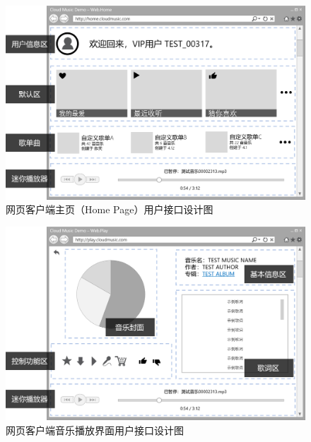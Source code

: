 \begin{figure}[h!]
  \centering

  \includegraphics[width=.95\linewidth]{figures/web_home}

  \caption{  \label{fig:web_home}
  		网页客户端主页（Home Page）用户接口设计图
    }
\end{figure}

\begin{figure}[h!]
  \centering
 
  \includegraphics[width=.95\linewidth]{figures/web_music}

  \caption{ \label{fig:web_music}
  		网页客户端音乐播放界面用户接口设计图
    }
\end{figure}

